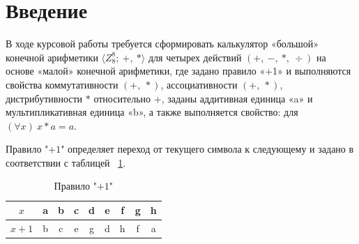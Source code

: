 \section*{Введение}

В ходе курсовой работы требуется сформировать калькулятор «большой» конечной арифметики
\(\langle Z^8_8;\ +,\ * \rangle\) для четырех действий
\((+,\ -,\ *,\ \div)\) на основе «малой» конечной арифметики, где задано
правило «+1» и выполняются свойства коммутативности \((+,\ *)\),
ассоциативности \((+,\ *)\), дистрибутивности \(*\) относительно \(+\),
заданы аддитивная единица «a» и мультипликативная единица «b», а также
выполняется свойство: для \((\forall x)\ x * a = a.\)


Правило "$+1$" определяет переход от текущего символа к следующему и задано в соответствии с таблицей ~\ref{tab:plus_one}.

\begin{table}[H]
    \centering
    \caption{Правило "$+1$"}
    \label{tab:plus_one}
    \begin{tabular}{|c|c|c|c|c|c|c|c|c|}
        \hline
        $x$ & a & b & c & d & e & f & g & h \\
        \hline
        $x + 1$ & b & c & e & g & d & h & f & a \\
        \hline
    \end{tabular}
\end{table} 
\newpage